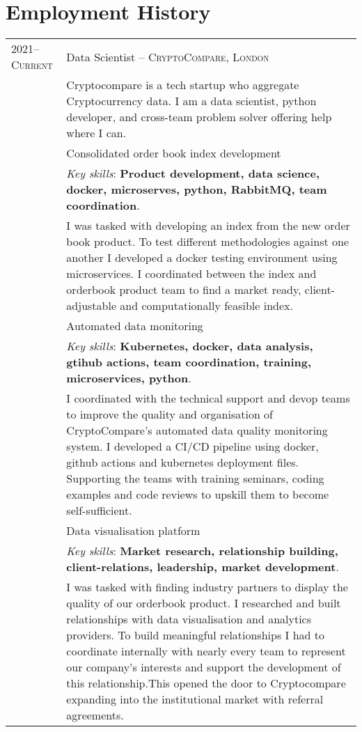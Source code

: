 \documentclass[a4paper,10pt]{article}
\newcommand{\tab}{\hspace{10 pt}}
\begin{document}
\section{Employment History}
\begin{tabular}{p{2.25cm}|p{15cm}}
%
%	
	\textsc{2021--Current} & Data Scientist -- \textsc{CryptoCompare, London}\\
	 & \footnotesize{Cryptocompare is a tech startup who aggregate Cryptocurrency data. I am a data scientist, python developer, and cross-team problem solver offering help where I can.}\\
	 & \tab Consolidated order book index development\\
	 & \footnotesize{\emph{Key skills}: \textbf{Product development, data science, docker, microserves, python, RabbitMQ, team coordination}.}\\
	 & \footnotesize{I was tasked with developing an index from the new order book product. To test different methodologies against one another I developed a docker testing environment using microservices. I coordinated between the index and orderbook product team to find a market ready, client-adjustable and computationally feasible index.} \vspace{0.05 in}\\
	 & \tab Automated data monitoring\\
	 & \footnotesize{\emph{Key skills}: \textbf{Kubernetes, docker, data analysis, gtihub actions, team coordination, training, microservices, python}.}\\
	 & \footnotesize{I coordinated with the technical support and devop teams to improve the quality and organisation of CryptoCompare’s automated data quality monitoring system. I developed a CI/CD pipeline using docker, github actions and kubernetes deployment files. Supporting the teams with training seminars, coding examples and code reviews to upskill them to become self-sufficient.} \vspace{0.05 in}\\	 
	 & \tab Data visualisation platform\\
	 & \footnotesize{\emph{Key skills}: \textbf{Market research, relationship building, client-relations, leadership, market development}.}\\
	 & \footnotesize{I was tasked with finding industry partners to display the quality of our orderbook product. I researched and built relationships with data visualisation and analytics providers. To build meaningful relationships I had to coordinate internally with nearly every team to represent our company's interests and support the development of this relationship.This opened the door to Cryptocompare expanding into the institutional market with referral agreements.} \vspace{0.05 in}\\	

\end{tabular}
\end{document}

